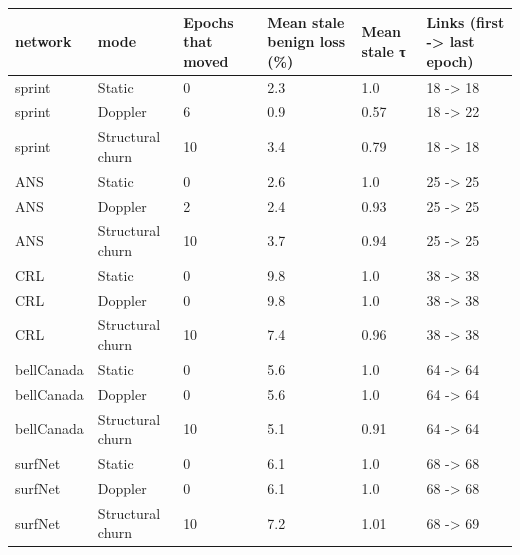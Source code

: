 \begin{tabular}{llllll}
\toprule
network & mode & Epochs that moved & Mean stale benign loss (\%) & Mean stale τ & Links (first -> last epoch) \\
\midrule
sprint & Static & 0 & 2.3 & 1.0 & 18 -> 18 \\
sprint & Doppler & 6 & 0.9 & 0.57 & 18 -> 22 \\
sprint & Structural churn & 10 & 3.4 & 0.79 & 18 -> 18 \\
ANS & Static & 0 & 2.6 & 1.0 & 25 -> 25 \\
ANS & Doppler & 2 & 2.4 & 0.93 & 25 -> 25 \\
ANS & Structural churn & 10 & 3.7 & 0.94 & 25 -> 25 \\
CRL & Static & 0 & 9.8 & 1.0 & 38 -> 38 \\
CRL & Doppler & 0 & 9.8 & 1.0 & 38 -> 38 \\
CRL & Structural churn & 10 & 7.4 & 0.96 & 38 -> 38 \\
bellCanada & Static & 0 & 5.6 & 1.0 & 64 -> 64 \\
bellCanada & Doppler & 0 & 5.6 & 1.0 & 64 -> 64 \\
bellCanada & Structural churn & 10 & 5.1 & 0.91 & 64 -> 64 \\
surfNet & Static & 0 & 6.1 & 1.0 & 68 -> 68 \\
surfNet & Doppler & 0 & 6.1 & 1.0 & 68 -> 68 \\
surfNet & Structural churn & 10 & 7.2 & 1.01 & 68 -> 69 \\
\bottomrule
\end{tabular}
